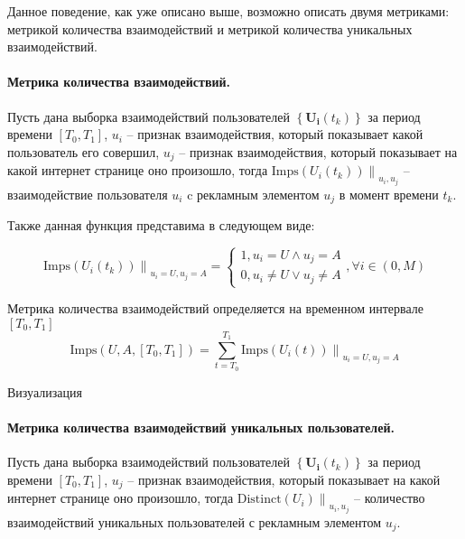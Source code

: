 \documentclass[a4paper, 14pt]{extreport}
\begin{document}
    Данное поведение, как уже описано выше, возможно описать двумя метриками: метрикой количества взаимодействий и
    метрикой количества уникальных взаимодействий.

    \paragraph{Метрика количества взаимодействий.} Пусть дана выборка взаимодействий пользователей
    $\left\{\mathbf{U_i}\left(t_k\right)\right\}$ за период времени $[T_0, T_1]$, $u_i$ -- признак взаимодействия,
    который показывает какой пользователь его совершил, $u_j$ -- признак взаимодействия, который показывает на какой
    интернет странице оно произошло, тогда $\left. \text{Imps} \left( U_i (t_k) \right) \right\|_{u_i, u_j}$ --
    взаимодействие пользователя $u_i$ c рекламным элементом $u_j$ в момент времени $t_k$.

    Также данная функция представима в следующем виде:

    \begin{equation}
        \left. \text{Imps} \left( U_i (t_k) \right) \right\|_{u_i = U, u_j = A} =
        \begin{cases}
            1, u_i = U \wedge u_j = A  \\
            0, u_i \neq U \vee u_j \neq A
        \end{cases}, \forall i \in (0, M)
    \end{equation}

    Метрика количества взаимодействий определяется на временном интервале $[T_0, T_1]$
    \begin{equation}
        \text{Imps} \left( U, A, \left[ T_0, T_1 \right] \right) =
        \sum \limits_{t=T_0}^{T_1} \left. \text{Imps} \left( U_i (t) \right) \right\|_{u_i = U, u_j = A}
    \end{equation}

    Визуализация

    \paragraph{Метрика количества взаимодействий уникальных пользователей.} Пусть дана выборка взаимодействий
    пользователей $\left\{\mathbf{U_i}\left(t_k\right)\right\}$ за период времени $[T_0, T_1]$,  $u_j$ -- признак
    взаимодействия, который показывает на какой интернет странице оно произошло, тогда
    $\left.\text{Distinct}\left( U_i \right)\right\|_{u_i, u_j}$ -- количество взаимодействий уникальных пользователей
    с рекламным элементом $u_j$.
\end{document}
